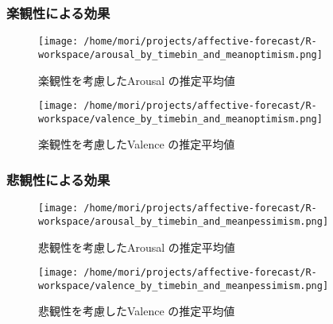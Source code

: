 \documentclass[a4paper,11pt]{article}
\begin{document}
\vspace{3ex}
\subsubsection*{楽観性による効果}
\begin{figure}[H]
  \centering
  \begin{minipage}{0.4\columnwidth}
     \centering
     \texttt{[image: /home/mori/projects/affective-forecast/R-workspace/arousal\_by\_timebin\_and\_meanoptimism.png]}
     \caption{楽観性を考慮したArousal の推定平均値}
  \end{minipage}
%
  \begin{minipage}{0.4\columnwidth}
     \centering
     \texttt{[image: /home/mori/projects/affective-forecast/R-workspace/valence\_by\_timebin\_and\_meanoptimism.png]}
     \caption{楽観性を考慮したValence の推定平均値}
  \end{minipage}
\end{figure}

\vspace{3ex}
\subsubsection*{悲観性による効果}
\begin{figure}[H]
  \centering
  \begin{minipage}{0.4\columnwidth}
     \centering
     \texttt{[image: /home/mori/projects/affective-forecast/R-workspace/arousal\_by\_timebin\_and\_meanpessimism.png]}
     \caption{悲観性を考慮したArousal の推定平均値}
  \end{minipage}
%
  \begin{minipage}{0.4\columnwidth}
     \centering
     \texttt{[image: /home/mori/projects/affective-forecast/R-workspace/valence\_by\_timebin\_and\_meanpessimism.png]}
     \caption{悲観性を考慮したValence の推定平均値}
  \end{minipage}
\end{figure}
\end{document}

